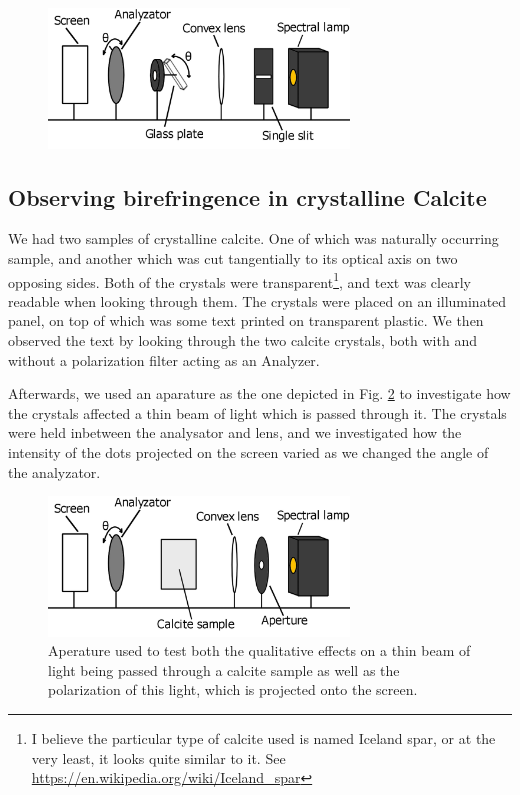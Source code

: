 \documentclass[11pt,a4paper, twocolumn]{article}
\begin{document}
    \begin{figure}[H]
      \center
      \includegraphics[width=8cm]{scripts/figs/diagram_4.png}
      \caption{}
      \label{fig:glassplate}
    \end{figure}

  \subsection{Observing birefringence in crystalline Calcite}
    We had two samples of crystalline calcite. One of which was naturally occurring sample, and another which was cut tangentially to its optical axis on two opposing sides. Both of the crystals were transparent\footnote{I believe the particular type of calcite used is named Iceland spar, or at the very least, it looks quite similar to it. See \url{https://en.wikipedia.org/wiki/Iceland_spar}}, and text was clearly readable when looking through them. The crystals were placed on an illuminated panel, on top of which was some text printed on transparent plastic. We then observed the text by looking through the two calcite crystals, both with and without a polarization filter acting as an Analyzer. 

    Afterwards, we used an aparature as the one depicted in Fig. \ref{fig:calcite} to investigate how the crystals affected a thin beam of light which is passed through it. The crystals were held inbetween the analysator and lens, and we investigated how the intensity of the dots projected on the screen varied as we changed the angle of the analyzator.

    \begin{figure}[H]
      \center
      \includegraphics[width=8cm]{scripts/figs/diagram_5.png}
      \caption{Aperature used to test both the qualitative effects on a thin beam of light being passed through a calcite sample as well as the polarization of this light, which is projected onto the screen.}
      \label{fig:calcite}
    \end{figure}
\end{document}
